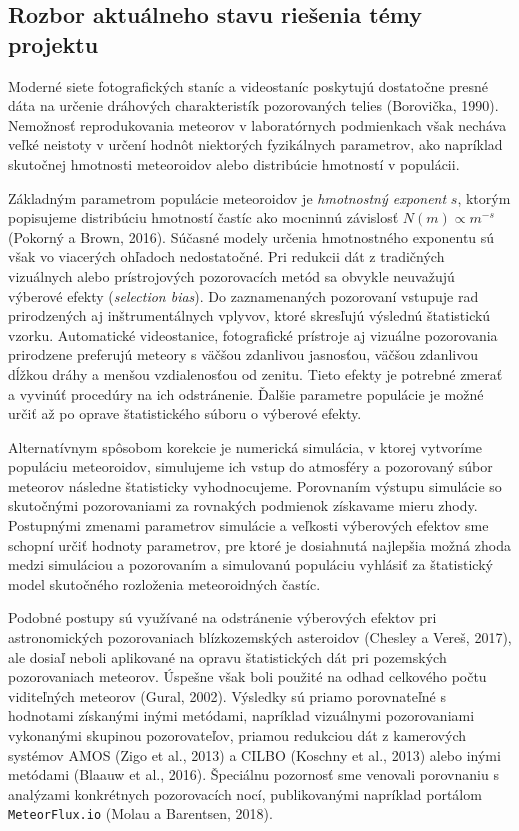 \subsection{Rozbor aktuálneho stavu riešenia témy
projektu}\label{rozbor-aktuuxe1lneho-stavu-rieux161enia-tuxe9my-projektu}

Moderné siete fotografických staníc a videostaníc poskytujú dostatočne
presné dáta na určenie dráhových charakteristík pozorovaných telies
(Borovička, 1990). Nemožnosť reprodukovania meteorov v laboratórnych
podmienkach však necháva veľké neistoty v určení hodnôt niektorých
fyzikálnych parametrov, ako napríklad skutočnej hmotnosti meteoroidov
alebo distribúcie hmotností v populácii.

Základným parametrom populácie meteoroidov je \emph{hmotnostný exponent}
\(s\), ktorým popisujeme distribúciu hmotností častíc ako mocninnú
závislosť \(N(m) \propto m^{-s}\) (Pokorný a Brown, 2016). Súčasné
modely určenia hmotnostného exponentu sú však vo viacerých ohľadoch
nedostatočné. Pri redukcii dát z tradičných vizuálnych alebo
prístrojových pozorovacích metód sa obvykle neuvažujú výberové efekty
(\emph{selection bias}). Do zaznamenaných pozorovaní vstupuje rad
prirodzených aj inštrumentálnych vplyvov, ktoré skresľujú výslednú
štatistickú vzorku. Automatické videostanice, fotografické prístroje aj
vizuálne pozorovania prirodzene preferujú meteory s väčšou zdanlivou
jasnosťou, väčšou zdanlivou dĺžkou dráhy a menšou vzdialenosťou od
zenitu. Tieto efekty je potrebné zmerať a vyvinúť procedúry na ich
odstránenie. Ďalšie parametre populácie je možné určiť až po oprave
štatistického súboru o výberové efekty.

Alternatívnym spôsobom korekcie je numerická simulácia, v ktorej
vytvoríme populáciu meteoroidov, simulujeme ich vstup do atmosféry a
pozorovaný súbor meteorov následne štatisticky vyhodnocujeme. Porovnaním
výstupu simulácie so skutočnými pozorovaniami za rovnakých podmienok
získavame mieru zhody. Postupnými zmenami parametrov simulácie a
veľkosti výberových efektov sme schopní určiť hodnoty parametrov, pre
ktoré je dosiahnutá najlepšia možná zhoda medzi simuláciou a pozorovaním
a simulovanú populáciu vyhlásiť za štatistický model skutočného
rozloženia meteoroidných častíc.

Podobné postupy sú využívané na odstránenie výberových efektov pri
astronomických pozorovaniach blízkozemských asteroidov (Chesley a Vereš,
2017), ale dosiaľ neboli aplikované na opravu štatistických dát pri
pozemských pozorovaniach meteorov. Úspešne však boli použité na odhad
celkového počtu viditeľných meteorov (Gural, 2002). Výsledky sú priamo
porovnateľné s hodnotami získanými inými metódami, napríklad vizuálnymi
pozorovaniami vykonanými skupinou pozorovateľov, priamou redukciou dát z
kamerových systémov AMOS (Zigo et al., 2013) a CILBO (Koschny et al.,
2013) alebo inými metódami (Blaauw et al., 2016). Špeciálnu pozornosť
sme venovali porovnaniu s analýzami konkrétnych pozorovacích nocí,
publikovanými napríklad portálom \texttt{MeteorFlux.io} (Molau a
Barentsen, 2018).

